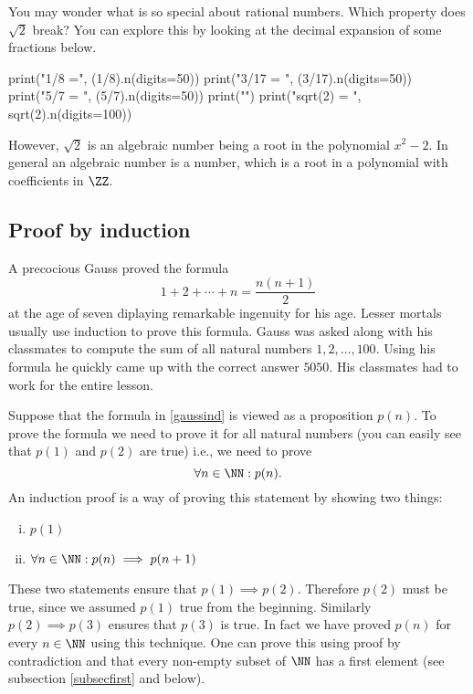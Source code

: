 \documentclass{article}
\begin{document}
You may wonder what is so special about rational numbers. Which property does
$\sqrt{2}$ break? You can explore this by looking at the decimal expansion of
some fractions below.

\begin{sage}
print("1/8 =", (1/8).n(digits=50))
print("3/17 = ", (3/17).n(digits=50))
print("5/7 = ", (5/7).n(digits=50))
print("")
print("sqrt(2) = ", sqrt(2).n(digits=100))
\end{sage}

However, $\sqrt{2}$ is an algebraic number being a root in the
polynomial $x^2 - 2$. In general an algebraic number is a number,
which is a root in a polynomial with coefficients in $\ZZ$.

\endshex


\subsection{Proof by induction}

A precocious Gauss proved the formula
\begin{equation}\label{gaussind}
1 + 2 + \cdots + n = \frac{n(n+1)}{2}
\end{equation}
at the age of seven diplaying remarkable ingenuity for his age. Lesser
mortals usually use induction to prove this formula. Gauss was asked
along with his classmates to compute the sum of all natural numbers
$1, 2, \dots, 100$. Using his formula he quickly came up with the correct
answer $5050$. His classmates had to work for the entire lesson.

Suppose that the formula in \eqref{gaussind} is viewed as a
proposition $p(n)$. To prove the formula we need to prove it for all
natural numbers (you can easily see that $p(1)$ and $p(2)$ are true) i.e.,
we need to prove
$$
\forall n\in \NN: p(n).
$$
An induction proof is a way of proving this statement by showing two things:
\begin{enumerate}[(i)]
\item
  $p(1)$
\item
  $\forall n\in \NN: p(n)\implies p(n+1)$
\end{enumerate}
These two statements ensure that $p(1) \implies p(2)$. Therefore
$p(2)$ must be true, since we assumed $p(1)$ true from the
beginning. Similarly $p(2)\implies p(3)$ ensures that $p(3)$
is true. In fact we have proved $p(n)$ for every $n\in \NN$
using this technique. One can prove this using proof by
contradiction and that every non-empty subset
of $\NN$ has a first element (see subsection \ref{subsecfirst} and below).
\end{document}
